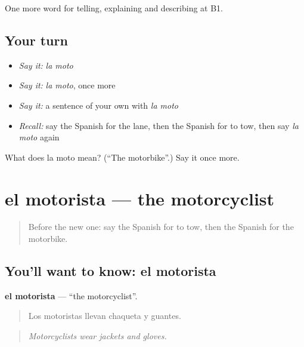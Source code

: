 \begin{grammarlens}[title={What you've built}]
One more word for telling, explaining and describing at B1.
\end{grammarlens}

\subsection*{Your turn}
\begin{itemize}
\raggedright
  \item \emph{Say it:} \emph{la moto}
  \item \emph{Say it:} \emph{la moto}, once more
  \item \emph{Say it:} a sentence of your own with \emph{la moto}
  \item \emph{Recall:} say the Spanish for the lane, then the Spanish for to tow, then say \emph{la moto} again
\end{itemize}

\begin{tcolorbox}[breakable,colback=teal!4,colframe=teal!35!black,title={Before you move on}]
What does la moto mean? (\textquotedblleft{}The motorbike\textquotedblright{}.) Say it once more.
\end{tcolorbox}
\section[el motorista]{el motorista — the motorcyclist}

\label{lesson:ES-C649-motorista}



\begin{quote}
Before the new one: say the Spanish for to tow, then the Spanish for the motorbike.
\end{quote}

\subsection*{You'll want to know: el motorista}
\textbf{el motorista} — \textquotedblleft{}the motorcyclist\textquotedblright{}.

\begin{quote}
Los motoristas llevan chaqueta y guantes.
\end{quote}

\begin{quote}
\emph{Motorcyclists wear jackets and gloves.}
\end{quote}

